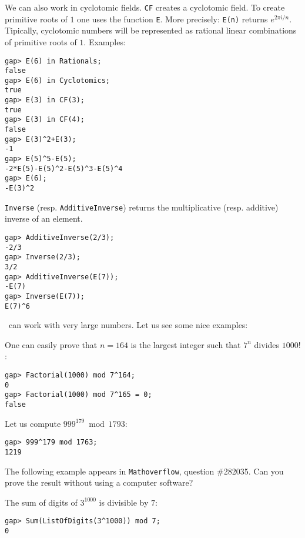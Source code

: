 We can also work in cyclotomic fields.  \lstinline{CF} creates a cyclotomic
field. To create primitive roots of $1$ one uses the function \lstinline{E}.
More precisely: \lstinline{E(n)} returns $e^{2\pi i/n}$. Tipically, cyclotomic
numbers will be represented as rational linear combinations of primitive roots
of $1$. Examples:
\begin{lstlisting}
gap> E(6) in Rationals;
false 
gap> E(6) in Cyclotomics;
true
gap> E(3) in CF(3);
true
gap> E(3) in CF(4);
false
gap> E(3)^2+E(3);
-1
gap> E(5)^5-E(5);
-2*E(5)-E(5)^2-E(5)^3-E(5)^4
gap> E(6);
-E(3)^2
\end{lstlisting}
\lstinline{Inverse} (resp. \lstinline{AdditiveInverse}) returns 
the multiplicative (resp. additive) inverse of an element. 
\begin{lstlisting}
gap> AdditiveInverse(2/3);
-2/3
gap> Inverse(2/3);
3/2
gap> AdditiveInverse(E(7));
-E(7)
gap> Inverse(E(7));
E(7)^6
\end{lstlisting}

\GAP~can work with very large numbers. 
Let us see some nice examples:

\begin{example}
	One can easily prove that $n=164$ is the largest integer such that $7^n$
	divides $1000!$:
\begin{lstlisting}
gap> Factorial(1000) mod 7^164;
0
gap> Factorial(1000) mod 7^165 = 0;
false
\end{lstlisting}
\end{example}

\begin{example}
Let us compute $999^{179}\bmod 1793$:
\begin{lstlisting}
gap> 999^179 mod 1763;
1219
\end{lstlisting}
\end{example}

The following example appears in \texttt{Mathoverflow}, question \#282035. Can you prove
the result without using a computer software?

\begin{example}
	The sum of digits of $3^{1000}$ is divisible by $7$: %
\begin{lstlisting}
gap> Sum(ListOfDigits(3^1000)) mod 7;
0
\end{lstlisting}
\end{example}



